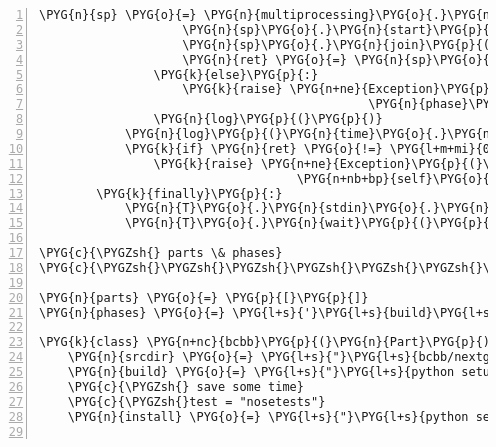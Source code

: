 \begin{Verbatim}[commandchars=\\\{\},numbers=left,firstnumber=1,stepnumber=5]
                    \PYG{n}{sp} \PYG{o}{=} \PYG{n}{multiprocessing}\PYG{o}{.}\PYG{n}{Process}\PYG{p}{(}\PYG{n}{target}\PYG{o}{=}\PYG{n}{tgt}\PYG{p}{)}
                    \PYG{n}{sp}\PYG{o}{.}\PYG{n}{start}\PYG{p}{(}\PYG{p}{)}
                    \PYG{n}{sp}\PYG{o}{.}\PYG{n}{join}\PYG{p}{(}\PYG{p}{)}
                    \PYG{n}{ret} \PYG{o}{=} \PYG{n}{sp}\PYG{o}{.}\PYG{n}{exitcode}
                \PYG{k}{else}\PYG{p}{:}
                    \PYG{k}{raise} \PYG{n+ne}{Exception}\PYG{p}{(}\PYG{l+s}{"}\PYG{l+s}{Invalid }\PYG{l+s}{'}\PYG{l+s+si}{\PYGZpc{}s}\PYG{l+s}{'}\PYG{l+s}{ phase command: }\PYG{l+s+si}{\PYGZpc{}s}\PYG{l+s}{"} \PYG{o}{\PYGZpc{}} \PYG{p}{(}
                                              \PYG{n}{phase}\PYG{p}{,}             \PYG{n+nb}{repr}\PYG{p}{(}\PYG{n}{cmd}\PYG{p}{)}\PYG{p}{)}\PYG{p}{)}
                \PYG{n}{log}\PYG{p}{(}\PYG{p}{)}
            \PYG{n}{log}\PYG{p}{(}\PYG{n}{time}\PYG{o}{.}\PYG{n}{asctime}\PYG{p}{(}\PYG{p}{)}\PYG{p}{)}
            \PYG{k}{if} \PYG{n}{ret} \PYG{o}{!=} \PYG{l+m+mi}{0}\PYG{p}{:}
                \PYG{k}{raise} \PYG{n+ne}{Exception}\PYG{p}{(}\PYG{l+s}{"}\PYG{l+s+si}{\PYGZpc{}s}\PYG{l+s}{ }\PYG{l+s}{'}\PYG{l+s+si}{\PYGZpc{}s}\PYG{l+s}{'}\PYG{l+s}{ phase failed -- exit code }\PYG{l+s+si}{\PYGZpc{}d}\PYG{l+s}{"} \PYG{o}{\PYGZpc{}} \PYG{p}{(}
                                    \PYG{n+nb+bp}{self}\PYG{o}{.}\PYG{n}{name}\PYG{p}{,} \PYG{n}{phase}\PYG{p}{,} \PYG{n}{ret}\PYG{p}{)}\PYG{p}{)}
        \PYG{k}{finally}\PYG{p}{:}
            \PYG{n}{T}\PYG{o}{.}\PYG{n}{stdin}\PYG{o}{.}\PYG{n}{close}\PYG{p}{(}\PYG{p}{)}
            \PYG{n}{T}\PYG{o}{.}\PYG{n}{wait}\PYG{p}{(}\PYG{p}{)}

\PYG{c}{\PYGZsh{} parts \& phases}
\PYG{c}{\PYGZsh{}\PYGZsh{}\PYGZsh{}\PYGZsh{}\PYGZsh{}\PYGZsh{}\PYGZsh{}\PYGZsh{}\PYGZsh{}\PYGZsh{}\PYGZsh{}\PYGZsh{}\PYGZsh{}\PYGZsh{}\PYGZsh{}\PYGZsh{}}

\PYG{n}{parts} \PYG{o}{=} \PYG{p}{[}\PYG{p}{]}
\PYG{n}{phases} \PYG{o}{=} \PYG{l+s}{'}\PYG{l+s}{build}\PYG{l+s}{'}\PYG{p}{,} \PYG{l+s}{'}\PYG{l+s}{test}\PYG{l+s}{'}\PYG{p}{,} \PYG{l+s}{'}\PYG{l+s}{install}\PYG{l+s}{'}

\PYG{k}{class} \PYG{n+nc}{bcbb}\PYG{p}{(}\PYG{n}{Part}\PYG{p}{)}\PYG{p}{:}
    \PYG{n}{srcdir} \PYG{o}{=} \PYG{l+s}{"}\PYG{l+s}{bcbb/nextgen}\PYG{l+s}{"}
    \PYG{n}{build} \PYG{o}{=} \PYG{l+s}{"}\PYG{l+s}{python setup.py build}\PYG{l+s}{"}
    \PYG{c}{\PYGZsh{} save some time}
    \PYG{c}{\PYGZsh{}test = "nosetests"}
    \PYG{n}{install} \PYG{o}{=} \PYG{l+s}{"}\PYG{l+s}{python setup.py install --prefix=\PYGZdl{}PREFIX}\PYG{l+s}{"}


\end{Verbatim}
